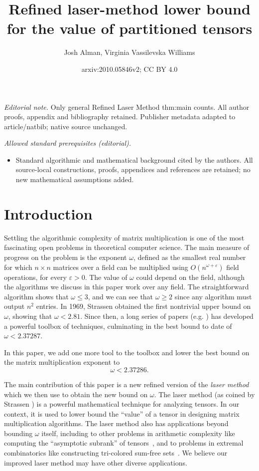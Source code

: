 \PassOptionsToPackage{shortlabels}{enumitem}\documentclass[10pt,a4paper]{article}
\title{Refined laser-method lower bound for the value of partitioned tensors}
\author{Josh Alman, Virginia Vassilevska Williams}
\date{arxiv:2010.05846v2; CC BY 4.0}
\newcommand{\eps}{\varepsilon}
\begin{document}
\maketitle
\noindent\textit{Editorial note.} Only general Refined Laser Method thm:main counts. All author proofs, appendix and bibliography retained. Publisher metadata adapted to article/natbib; native source unchanged.\par\medskip
\noindent\textit{Allowed standard prerequisites (editorial).}\begin{itemize}
\item Standard algorithmic and mathematical background cited by the authors. All source-local constructions, proofs, appendices and references are retained; no new mathematical assumptions added.
\end{itemize}\medskip
\section{Introduction}
Settling the algorithmic complexity of matrix multiplication is one of the most fascinating open problems in theoretical computer science. The main measure of progress on the problem is the exponent $\omega$, defined as the smallest real number for which $n\times n$ matrices over a field can be multiplied using $O(n^{\omega+\eps})$ field operations, for every $\eps>0$. The value of $\omega$ could depend on the field, although the algorithms we discuss in this paper work over any field.
The straightforward algorithm shows that $\omega\leq 3$, and we can see that $\omega\geq 2$ since any algorithm must output $n^2$ entries. In 1969, Strassen \cite{strassen} obtained the first nontrivial upper bound on $\omega$, showing that $\omega<2.81$. Since then, a long series of papers (e.g. \cite{Pan78,BCRL79,Pan80,Sch81,Romani82,cw81as,laser,coppersmith,stothers,v12,legall,cohn2003group,cohn2005group,cohn2013fast}) has developed a powerful toolbox of techniques, culminating in the best bound to date of $\omega<2.37287$.

In this paper, we add one more tool to the toolbox and lower the best bound on the matrix multiplication exponent to $$\omega<2.37286.$$ 

The main contribution of this paper is a new refined version of the {\em laser method} which we then use to obtain the new bound on $\omega$. The laser method (as coined by Strassen \cite{laser}) is a powerful mathematical technique for analyzing tensors. In our context, it is used to lower bound the ``value'' of a tensor in designing matrix multiplication algorithms. The laser method also has applications beyond bounding $\omega$ itself, including to other problems in arithmetic complexity like computing the ``asymptotic subrank'' of tensors~\cite{Alman19}, and to problems in extremal combinatorics like constructing tri-colored sum-free sets~\cite{kleinberg}. We believe our improved laser method may have other diverse applications.
\end{document}
